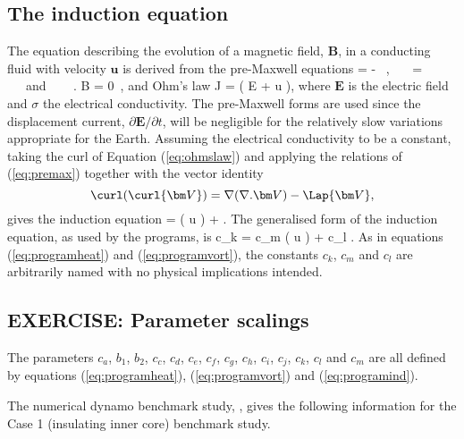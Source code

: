 \subsection{ The induction equation }
\label{subsec:inductioneq}

The equation describing the evolution of a magnetic
field, ${\bm B}$, in a conducting fluid with velocity ${\bm u}$
is derived from the pre-Maxwell equations
\beq
{} = -  ~,~~~
 =  ~~~{\rm and }~~~
\nabla . {\bm B} = 0~,
\label{eq:premax}
\eeq
and Ohm's law
\beq
{\bm J } = \sigma ( {\bm E} + {\bm u }  ),
\label{eq:ohmslaw}
\eeq
where ${\bm E}$ is the
electric field and $\sigma$
the electrical conductivity.
The pre-Maxwell forms are used since the displacement
current, $\partial {\bm E} / \partial t $, will
be negligible for the relatively slow variations
appropriate for the Earth.
Assuming the electrical conductivity to be a constant,
taking the curl of Equation (\ref{eq:ohmslaw})
and applying the relations of (\ref{eq:premax})
together with the vector identity
\begin{displaymath}
\curl ( \curl {\bm V } ) = \nabla ( \nabla . {\bm V} )
- \Lap {\bm V },
\end{displaymath}
gives the induction equation
\beq
{} = \curl ( {\bm u }  )
+  .
\label{eq:basicindone}
\eeq
The generalised form of the induction equation, as used
by the programs, is 
\beq
c_k  =
c_m \curl ( {\bm u }  )
+ c_l .
\label{eq:programind}
\eeq
As in equations (\ref{eq:programheat}) and
(\ref{eq:programvort}), the constants $c_k$, $c_m$ and
$c_l$ are arbitrarily named with no physical
implications intended.

\subsection{ EXERCISE: Parameter scalings }
\label{subsec:parameterscaleex}

The parameters $c_a$, $b_1$, $b_2$, $c_c$, $c_d$, $c_e$,
$c_f$, $c_g$, $c_h$, $c_i$, $c_j$, $c_k$, $c_l$ and $c_m$
are all defined by equations (\ref{eq:programheat}),
(\ref{eq:programvort}) and (\ref{eq:programind}).

The numerical dynamo benchmark study, \cite{bench},
gives the following information for the Case 1
(insulating inner core) benchmark study.

